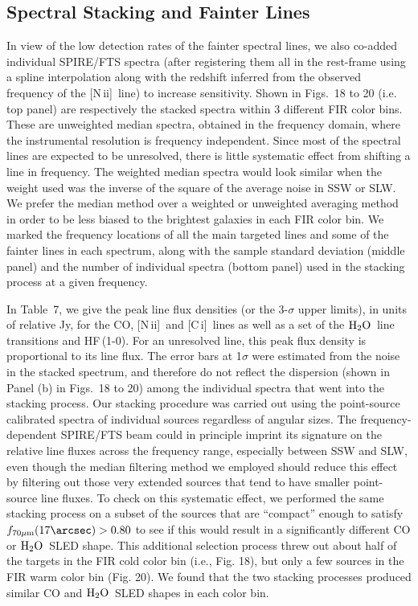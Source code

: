 \documentclass[preprint]{aastex}
\newcommand{\Water}{\mbox{${\rm H}_2{\rm O}$}}
\newcommand{\CI}{[C\,{\sc i}]}
\newcommand{\NII}{\mbox{[N\,{\sc ii}]}}
\begin{document}
\subsection{Spectral Stacking and Fainter Lines} \label{sec5.7}


In view of the low detection rates of the fainter spectral lines, we also 
co-added individual SPIRE/FTS spectra (after registering them all in 
the rest-frame using a spline interpolation along with the redshift 
inferred from the observed frequency of the \NII\ line) to increase 
sensitivity.  Shown in Figs.~18 to 20 (i.e. top panel) are respectively 
the stacked spectra within 3 different FIR color bins.  These are unweighted
median spectra, obtained in the frequency domain, where the instrumental 
resolution is frequency independent. Since most of the spectral lines are 
expected to be unresolved, there is little systematic effect from shifting 
a line in frequency.   The weighted median spectra would look 
similar when the weight used was the inverse of the square of the average 
noise in SSW or SLW.   We prefer the median method over a weighted or 
unweighted averaging method in order to be less biased to the brightest 
galaxies in each FIR color bin.  We marked the frequency locations of 
all the main targeted lines and some of the fainter lines in each spectrum, 
along with the sample standard deviation (middle panel) and the number 
of individual spectra (bottom panel) used in the stacking process at a 
given frequency.   




In Table~7, we give the peak line flux densities (or the 3-$\sigma$ upper limits),
in units of relative Jy, for the CO, \NII\ and \CI\ lines as well as a set of 
the \Water\ line transitions and HF\,(1-0).  For an unresolved line, this peak 
flux density is proportional to its line flux.  The error bars at 1$\sigma$ were 
estimated from the noise in the stacked spectrum, and therefore do not reflect 
the dispersion (shown in Panel (b) in Figs.~18 to 20) among the individual 
spectra that went into the stacking process. 
Our stacking procedure was carried out using the point-source calibrated
spectra of individual sources regardless of angular sizes. 
The frequency-dependent SPIRE/FTS beam could in principle imprint its signature 
on the relative line fluxes across the frequency range, especially between SSW 
and SLW, even though the median filtering method we employed should reduce this 
effect by filtering out those very extended sources that tend to have smaller 
point-source line fluxes.  To check on this systematic effect, we performed 
the same stacking 
process on a subset of the sources that are ``compact'' enough to satisfy 
$f_{70\mu{\rm m}}(17\arcsec) > 0.80$ to see if this would result in a significantly
different CO or \Water\ SLED shape.  This additional selection process threw out 
about half of the targets in the FIR cold color bin (i.e., Fig. 18), but only 
a few sources in the FIR warm color bin (Fig. 20). We found that the two stacking 
processes produced similar CO and \Water\ SLED shapes in each color bin.
\end{document}
